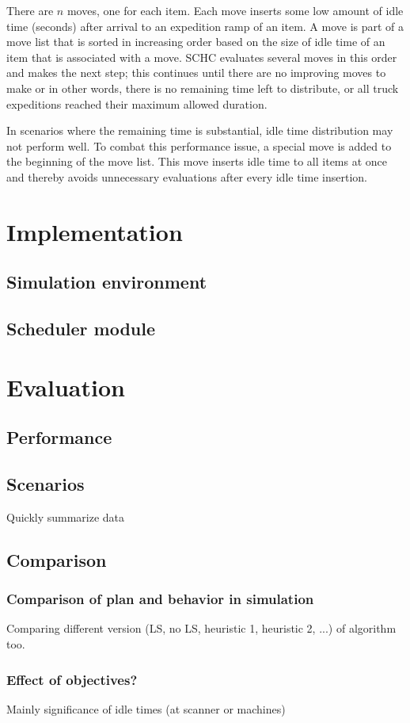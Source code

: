 \documentclass{ctuthesis}
\begin{document}
There are $n$ moves, one for each item. Each move inserts some low amount of idle time (seconds) after arrival to an expedition ramp of an item. A move is part of a move list that is sorted in increasing order based on the size of idle time of an item that is associated with a move. SCHC evaluates several moves in this order and makes the next step; this continues until there are no improving moves to make or in other words, there is no remaining time left to distribute, or all truck expeditions reached their maximum allowed duration.

In scenarios where the remaining time is substantial, idle time distribution may not perform well. To combat this performance issue, a special move is added to the beginning of the move list. This move inserts idle time to all items at once and thereby avoids unnecessary evaluations after every idle time insertion.

\chapter{Implementation}
\section{Simulation environment}
\section{Scheduler module}
\chapter{Evaluation}
\label{ch:Evaluation}
\section{Performance}
\section{Scenarios}
Quickly summarize data 
\section{Comparison}
\subsection{Comparison of plan and behavior in simulation}
Comparing different version (LS, no LS, heuristic 1, heuristic 2, ...) of algorithm too.
\subsection{Effect of objectives?}
Mainly significance of idle times (at scanner or machines)
\end{document}
